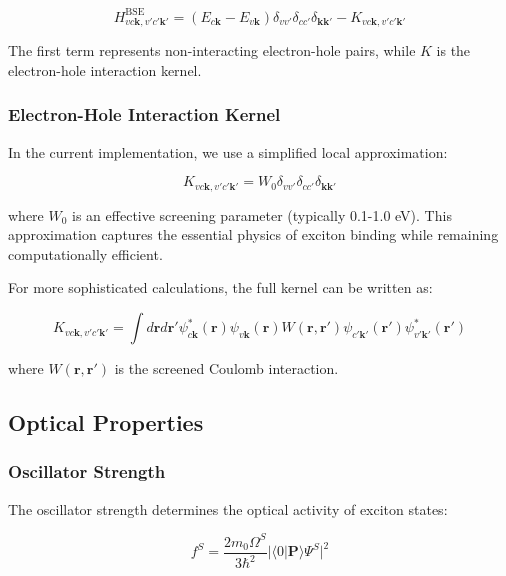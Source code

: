 \documentclass[11pt,a4paper]{article}
\newcommand{\braket}[2]{\langle #1|#2\rangle}
\begin{document}
\begin{equation}
H^{\text{BSE}}_{vc\mathbf{k},v'c'\mathbf{k}'} = (E_{c\mathbf{k}} - E_{v\mathbf{k}})\delta_{vv'}\delta_{cc'}\delta_{\mathbf{kk}'} - K_{vc\mathbf{k},v'c'\mathbf{k}'}
\end{equation}

The first term represents non-interacting electron-hole pairs, while $K$ is the electron-hole interaction kernel.

\subsubsection{Electron-Hole Interaction Kernel}

In the current implementation, we use a simplified local approximation:

\begin{equation}
K_{vc\mathbf{k},v'c'\mathbf{k}'} = W_0 \delta_{vv'}\delta_{cc'}\delta_{\mathbf{kk}'}
\end{equation}

where $W_0$ is an effective screening parameter (typically 0.1-1.0 eV). This approximation captures the essential physics of exciton binding while remaining computationally efficient.

For more sophisticated calculations, the full kernel can be written as:

\begin{equation}
K_{vc\mathbf{k},v'c'\mathbf{k}'} = \int d\mathbf{r} d\mathbf{r}' \psi^*_{c\mathbf{k}}(\mathbf{r}) \psi_{v\mathbf{k}}(\mathbf{r}) W(\mathbf{r},\mathbf{r}') \psi_{c'\mathbf{k}'}(\mathbf{r}') \psi^*_{v'\mathbf{k}'}(\mathbf{r}')
\end{equation}

where $W(\mathbf{r},\mathbf{r}')$ is the screened Coulomb interaction.

\subsection{Optical Properties}

\subsubsection{Oscillator Strength}

The oscillator strength determines the optical activity of exciton states:

\begin{equation}
f^S = \frac{2m_0 \Omega^S}{3\hbar^2} |\braket{0}{\mathbf{P}}{\Psi^S}|^2
\end{equation}
\end{document}
